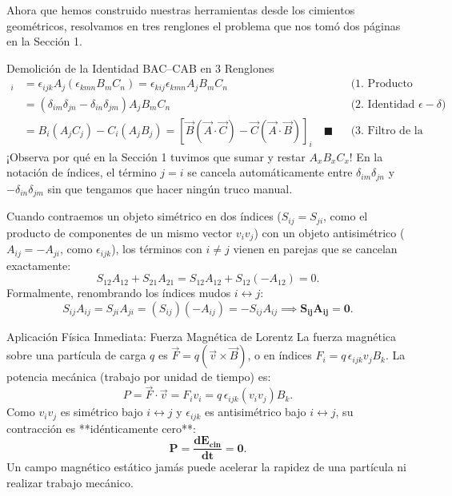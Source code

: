 \documentclass[11pt,letterpaper]{article}
\begin{document}

Ahora que hemos construido nuestras herramientas desde los cimientos geométricos, resolvamos en tres renglones el problema que nos tomó dos páginas en la Sección 1.

\begin{examplebox}{Demolición de la Identidad BAC--CAB en 3 Renglones}
\begin{align*}
[\vec{A} \times (\vec{B} \times \vec{C})]_i &= \epsilon_{ijk} A_j (\epsilon_{kmn} B_m C_n) = \epsilon_{kij}\epsilon_{kmn} A_j B_m C_n && \text{(1. Producto cruz en índices)} \\
&= (\delta_{im}\delta_{jn} - \delta_{in}\delta_{jm}) A_j B_m C_n && \text{(2. Identidad } \epsilon-\delta \text{)} \\
&= B_i (A_j C_j) - C_i (A_j B_j) = [\vec{B}(\vec{A}\cdot\vec{C}) - \vec{C}(\vec{A}\cdot\vec{B})]_i \quad \blacksquare && \text{(3. Filtro de la delta)}
\end{align*}
¡Observa por qué en la Sección 1 tuvimos que sumar y restar $A_x B_x C_x$! En la notación de índices, el término $j=i$ se cancela automáticamente entre $\delta_{im}\delta_{jn}$ y $-\delta_{in}\delta_{jm}$ sin que tengamos que hacer ningún truco manual.
\end{examplebox}

Cuando contraemos un objeto simétrico en dos índices ($S_{ij} = S_{ji}$, como el producto de componentes de un mismo vector $v_i v_j$) con un objeto antisimétrico ($A_{ij} = -A_{ji}$, como $\epsilon_{ijk}$), los términos con $i \neq j$ vienen en parejas que se cancelan exactamente:
\[
S_{12} A_{12} + S_{21} A_{21} = S_{12} A_{12} + S_{12}(-A_{12}) = 0.
\]
Formalmente, renombrando los índices mudos $i \leftrightarrow j$:
\[
S_{ij} A_{ij} = S_{ji} A_{ji} = (S_{ij})(-A_{ij}) = -S_{ij} A_{ij} \implies \mathbf{S_{ij} A_{ij} = 0}.
\]

\begin{examplebox}{Aplicación Física Inmediata: Fuerza Magnética de Lorentz}
La fuerza magnética sobre una partícula de carga $q$ es $\vec{F} = q(\vec{v} \times \vec{B})$, o en índices $F_i = q\,\epsilon_{ijk} v_j B_k$. La potencia mecánica (trabajo por unidad de tiempo) es:
\[
P = \vec{F}\cdot\vec{v} = F_i v_i = q\,\epsilon_{ijk} (v_i v_j) B_k.
\]
Como $v_i v_j$ es simétrico bajo $i \leftrightarrow j$ y $\epsilon_{ijk}$ es antisimétrico bajo $i \leftrightarrow j$, su contracción es **idénticamente cero**:
\[
\mathbf{P = \frac{dE_{\text{cin}}}{dt} = 0}.
\]
 Un campo magnético estático jamás puede acelerar la rapidez de una partícula ni realizar trabajo mecánico.
\end{examplebox}
\end{document}
